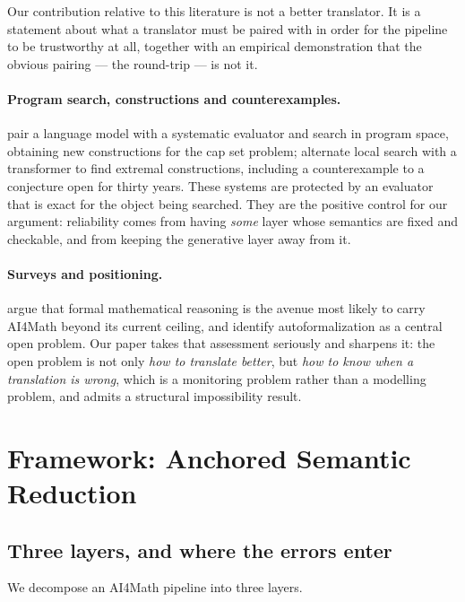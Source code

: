 \documentclass[11pt]{article}
\theoremstyle{definition}
\begin{document}
Our contribution relative to this literature is not a better translator. It is a
statement about what a translator must be paired with in order for the pipeline
to be trustworthy at all, together with an empirical demonstration that the
obvious pairing --- the round-trip --- is not it.

\paragraph{Program search, constructions and counterexamples.}
\citet{romeraparedes2024funsearch} pair a language model with a systematic
evaluator and search in program space, obtaining new constructions for the cap
set problem; \citet{charton2024patternboost} alternate local search with a
transformer to find extremal constructions, including a counterexample to a
conjecture open for thirty years. These systems are protected by an evaluator
that is exact for the object being searched. They are the positive control for
our argument: reliability comes from having \emph{some} layer whose semantics are
fixed and checkable, and from keeping the generative layer away from it.

\paragraph{Surveys and positioning.}
\citet{yang2024formalreasoning} argue that formal mathematical reasoning is the
avenue most likely to carry AI4Math beyond its current ceiling, and identify
autoformalization as a central open problem. Our paper takes that assessment
seriously and sharpens it: the open problem is not only \emph{how to translate
better}, but \emph{how to know when a translation is wrong}, which is a
monitoring problem rather than a modelling problem, and admits a structural
impossibility result.

\section{Framework: Anchored Semantic Reduction}
\label{sec:framework}

\subsection{Three layers, and where the errors enter}

We decompose an AI4Math pipeline into three layers.
\end{document}
